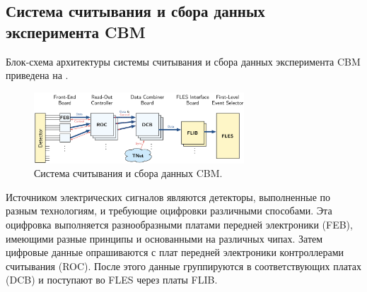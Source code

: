
\subsection{Система считывания и сбора данных эксперимента CBM}\label{sec:CBMreadout}

Блок-схема архитектуры системы считывания и сбора данных эксперимента CBM приведена на .

\begin{figure}[H]
\centering
\includegraphics[width=0.7\textwidth]{pictures/CBMreadout.png}
\caption{Система считывания и сбора данных CBM.}
\label{fig:CBMreadout}
\end{figure}

Источником электрических сигналов являются детекторы, выполненные по разным технологиям, и требующие оцифровки различными способами. Эта оцифровка выполняется разнообразными платами передней электроники (FEB), имеющими разные принципы и основанными на различных чипах. Затем цифровые данные опрашиваются с плат передней электроники контроллерами считывания (ROC). После этого данные группируются в соответствующих платах (DCB) и поступают во FLES через платы FLIB.

